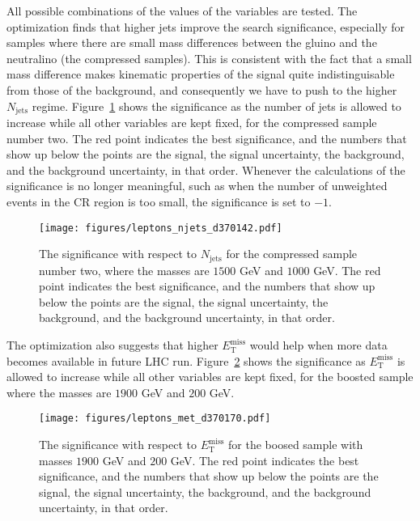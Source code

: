 All possible combinations of the values of the variables are tested. The
optimization finds that higher jets improve the search significance, especially
for samples where there are small mass differences between the gluino and the
neutralino (the compressed samples). This is consistent with the fact that a
small mass difference makes kinematic properties of the signal quite
indistinguisable from those of the background, and consequently we have to push
to the higher $N_{\text{jets}}$ regime. Figure~\ref{f:mbnjetsop} shows the
significance as the number of jets is allowed to increase while all other
variables are kept fixed, for the compressed sample number two. The red point
indicates the best significance, and the numbers that show up below the points
are the signal, the signal uncertainty, the background, and the background
uncertainty, in that order. Whenever the calculations of the significance is no
longer meaningful, such as when the number of unweighted events in the CR
region is too small, the significance is set to $-1$.

\begin{figure}[H]
	\texttt{[image: figures/leptons\_njets\_d370142.pdf]}
	\centering

	\caption{The significance with respect to $N_{\text{jets}}$ for the
		compressed sample number two, where the masses are $1500$ GeV and $1000$ GeV.
		The red point indicates the best significance, and the numbers that show up
		below the points are the signal, the signal uncertainty, the background, and
		the background uncertainty, in that order.}

	\label{f:mbnjetsop}
\end{figure}

The optimization also suggests that higher $E_{\text{T}}^{\text{miss}}$ would
help when more data becomes available in future LHC run.
Figure~\ref{f:mbmetsop} shows the significance as $E_{\text{T}}^{\text{miss}}$
is allowed to increase while all other variables are kept fixed, for the
boosted sample where the masses are $1900$ GeV and $200$ GeV.

\begin{figure}[H]
	\texttt{[image: figures/leptons\_met\_d370170.pdf]}
	\centering

	\caption{The significance with respect to $E_{\text{T}}^{\text{miss}}$ for
		the boosed sample with masses $1900$ GeV and $200$ GeV. The red point
		indicates the best significance, and the numbers that show up below the
		points are the signal, the signal uncertainty, the background, and the
		background uncertainty, in that order.}

	\label{f:mbmetsop}
\end{figure}

